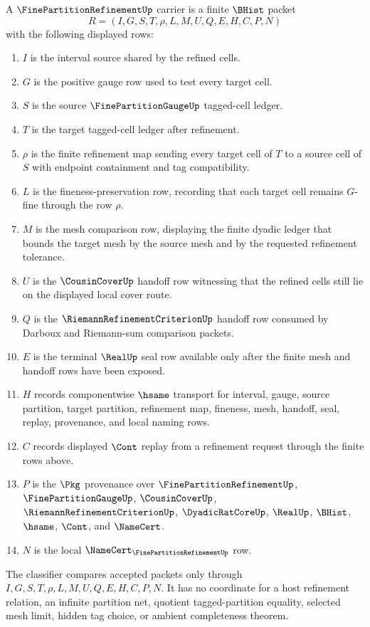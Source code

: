 \begin{definition}
\label{def:fine-partition-refinement-carrier}
A $\FinePartitionRefinementUp$ carrier is a finite $\BHist$ packet
$$
R=(I,G,S,T,\rho,L,M,U,Q,E,H,C,P,N)
$$
with the following displayed rows:
\begin{enumerate}
\item $I$ is the interval source shared by the refined cells.
\item $G$ is the positive gauge row used to test every target cell.
\item $S$ is the source $\FinePartitionGaugeUp$ tagged-cell ledger.
\item $T$ is the target tagged-cell ledger after refinement.
\item $\rho$ is the finite refinement map sending every target cell of $T$ to a source cell of $S$ with endpoint containment and tag compatibility.
\item $L$ is the fineness-preservation row, recording that each target cell remains $G$-fine through the row $\rho$.
\item $M$ is the mesh comparison row, displaying the finite dyadic ledger that bounds the target mesh by the source mesh and by the requested refinement tolerance.
\item $U$ is the $\CousinCoverUp$ handoff row witnessing that the refined cells still lie on the displayed local cover route.
\item $Q$ is the $\RiemannRefinementCriterionUp$ handoff row consumed by Darboux and Riemann-sum comparison packets.
\item $E$ is the terminal $\RealUp$ seal row available only after the finite mesh and handoff rows have been exposed.
\item $H$ records componentwise $\hsame$ transport for interval, gauge, source partition, target partition, refinement map, fineness, mesh, handoff, seal, replay, provenance, and local naming rows.
\item $C$ records displayed $\Cont$ replay from a refinement request through the finite rows above.
\item $P$ is the $\Pkg$ provenance over $\FinePartitionRefinementUp$, $\FinePartitionGaugeUp$, $\CousinCoverUp$, $\RiemannRefinementCriterionUp$, $\DyadicRatCoreUp$, $\RealUp$, $\BHist$, $\hsame$, $\Cont$, and $\NameCert$.
\item $N$ is the local $\NameCert_{\FinePartitionRefinementUp}$ row.
\end{enumerate}
The classifier compares accepted packets only through $I,G,S,T,\rho,L,M,U,Q,E,H,C,P,N$. It has no coordinate for a host refinement relation, an infinite partition net, quotient tagged-partition equality, selected mesh limit, hidden tag choice, or ambient completeness theorem.
\end{definition}

